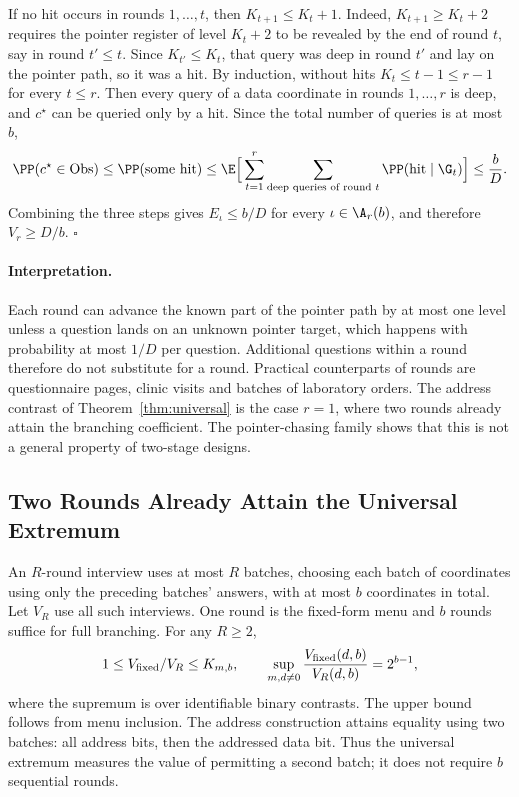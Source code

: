 If no hit occurs in rounds $1,\ldots,t$, then $K_{t+1}\le K_t+1$. Indeed,
$K_{t+1}\ge K_t+2$ requires the pointer register of level $K_t+2$ to be
revealed by the end of round $t$, say in round $t'\le t$. Since
$K_{t'}\le K_t$, that query was deep in round $t'$ and lay on the pointer path,
so it was a hit. By induction, without hits $K_t\le t-1\le r-1$ for every
$t\le r$. Then every query of a data coordinate in rounds $1,\ldots,r$ is deep,
and $c^\star$ can be queried only by a hit. Since the total number of queries
is at most $b$,
\[
 \PP(c^\star\in{\rm Obs})\le\PP(\text{some hit})
 \le\E\Big[\sum_{t=1}^r\sum_{\text{deep queries of round }t}\PP(\text{hit}\mid\G_t)\Big]
 \le\frac bD .
\]
Combining the three steps gives $E_\iota\le b/D$ for every $\iota\in\A_r(b)$,
and therefore $V_r\ge D/b$. \hfill$\square$



\paragraph{Interpretation.}
Each round can advance the known part of the pointer path by at most one
level unless a question lands on an unknown pointer target, which happens
with probability at most $1/D$ per question. Additional questions within a
round therefore do not substitute for a round. Practical counterparts of
rounds are questionnaire pages, clinic visits and batches of laboratory
orders. The address contrast of Theorem~\ref{thm:universal} is the case
$r=1$, where two rounds already attain the branching coefficient. The
pointer-chasing family shows that this is not a general property of
two-stage designs.

\subsection{Two Rounds Already Attain the Universal Extremum}\label{app:rounds}
An $R$-round interview uses at most $R$ batches, choosing each batch of coordinates using only the preceding batches' answers, with at most $b$ coordinates in total. Let $V_R$ use all such interviews. One round is the fixed-form menu and $b$ rounds suffice for full branching. For any $R\ge2$,
\[
 1\le V_{\rm fixed}/V_R\le K_{m,b},\qquad
 \sup_{m,d\ne0}\frac{V_{\rm fixed}(d,b)}{V_R(d,b)}=2^{b-1},
\]
where the supremum is over identifiable binary contrasts. The upper bound follows from menu inclusion. The address construction attains equality using two batches: all address bits, then the addressed data bit. Thus the universal extremum measures the value of permitting a second batch; it does not require $b$ sequential rounds.


